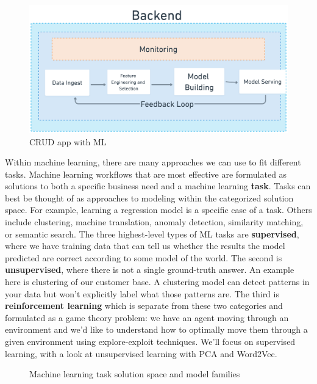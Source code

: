 \documentclass[11pt, table]{diazessay} %
\begin{document}
\begin{sloppypar}
\begin{figure}[H]
\centering
\includegraphics[width=1\textwidth]{figures/ml_system.png}
\caption{CRUD app with ML}
\end{figure}

Within machine learning, there are many approaches we can use to fit different tasks.  Machine learning workflows that are most effective are formulated as solutions to both a specific business need and a machine learning \textbf{task}. Tasks can best be thought of as approaches to modeling within the categorized solution space. For example, learning a regression model is a specific case of a task. Others include clustering, machine translation, anomaly detection, similarity matching, or semantic search.  The  three highest-level types of ML tasks are  \textbf{supervised}, where we have training data that can tell us whether the results the model predicted are correct according to some model of the world. The second is \textbf{unsupervised}, where there is not a single ground-truth answer. An example here is clustering of our customer base. A clustering model can detect patterns in your data but won't explicitly label what those patterns are. The third is \textbf{reinforcement learning}  which is separate from these two categories and formulated as a game theory problem: we have an agent moving through an environment and we'd like to understand how to optimally move them through a given environment using explore-exploit techniques. We'll focus on supervised learning, with a look at unsupervised learning with PCA and Word2Vec.
 
\begin{figure}[H]
	\centering
 	\caption{Machine learning task solution space and model families}
\end{figure}



\end{sloppypar}
\end{document}
